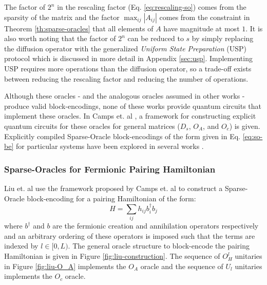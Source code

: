 The factor of $2^n$ in the rescaling factor (Eq. \ref{eq:rescaling-so}) comes from the sparsity of the matrix and the factor $\max_{ij} {|A_{ij}|}$ comes from the constraint in Theorem \ref{th:sparse-oracles} that all elements of $A$ have magnitude at most $1$.
It is also worth noting that the factor of $2^n$ can be reduced to $s$ by simply replacing the diffusion operator with the generalized \textit{Uniform State Preparation} (USP) protocol which is discussed in more detail in Appendix \ref{sec:usp}.
Implementing USP requires more operations than the diffusion operator, so a trade-off exists between reducing the rescaling factor and reducing the number of operations.

Although these oracles - and the analogous oracles assumed in other works \cite{berry2009black, childs2009universal, berry2015hamiltonian, berry2015simulating,low2017optimal,childs2017quantum,gilyen2019quantum} - produce valid block-encodings, none of these works provide quantum circuits that implement these oracles.
In Camps et. al \cite{camps2024explicit}, a framework for constructing explicit quantum circuits for these oracles for general matrices ($D_s$, $O_A$, and $O_c$) is given.
Explicitly compiled Sparse-Oracle block-encodings of the form given in Eq. \ref{eq:so-be} for particular systems have been explored in several works \cite{camps2022fable, liu2024efficient, sanavio2024explicit} .

\subsubsection{Sparse-Oracles for Fermionic Pairing Hamiltonian}

Liu et. al \cite{liu2024efficient} use the framework proposed by Camps et. al \cite{camps2024explicit} to construct a Sparse-Oracle block-encoding for a pairing Hamiltonian of the form:
\begin{equation}
    \label{eq:pairing-ham}
    H = \sum_{ij}h_{ij}b^\dagger_i b_j
\end{equation}
where $b^\dagger$ and $b$ are the fermionic creation and annihilation operators respectively and an arbitrary ordering of these operators is imposed such that the terms are indexed by $l \in [0, L)$.
The general oracle structure to block-encode the pairing Hamiltonian is given in Figure \ref{fig:liu-construction}.
The sequence of $O_H^l$ unitaries in Figure \ref{fig:liu-O_A} implements the $O_A$ oracle and the sequence of $U_l$ unitaries implements the $O_c$ oracle.

